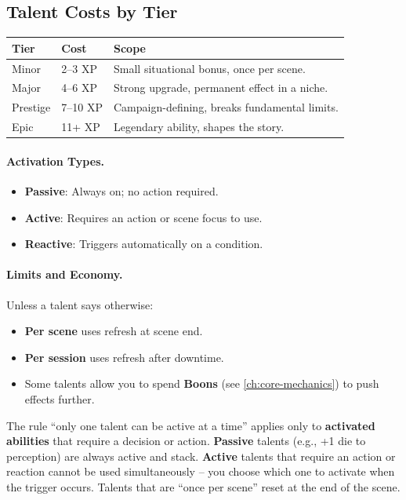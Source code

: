 \subsection*{Talent Costs by Tier}
\label{sec:talent-costs}

\begin{center}
\begin{tabular}{lll}
\toprule
\textbf{Tier} & \textbf{Cost} & \textbf{Scope} \\
\midrule
Minor & 2--3 XP & Small situational bonus, once per scene. \\
Major & 4--6 XP & Strong upgrade, permanent effect in a niche. \\
Prestige & 7--10 XP & Campaign-defining, breaks fundamental limits. \\
Epic & 11+ XP & Legendary ability, shapes the story. \\
\bottomrule
\end{tabular}
\end{center}

\paragraph{Activation Types.}
\label{sec:talent-activation}
\begin{itemize}
\item \textbf{Passive}: Always on; no action required.
\item \textbf{Active}: Requires an action or scene focus to use.
\item \textbf{Reactive}: Triggers automatically on a condition.
\end{itemize}

\paragraph{Limits and Economy.}
\label{sec:talent-limits}
Unless a talent says otherwise:
\begin{itemize}
\item \textbf{Per scene} uses refresh at scene end.
\item \textbf{Per session} uses refresh after downtime.
\item Some talents allow you to spend \textbf{Boons} (see \ref{ch:core-mechanics}) to push effects further.
\end{itemize}

\begin{tcolorbox}[colback=yellow!5!white,colframe=yellow!75!black,title=\textbf{Only One Active Talent?},breakable]
The rule ``only one talent can be active at a time'' applies only to \textbf{activated abilities} that require a decision or action.  
\textbf{Passive} talents (e.g., +1 die to perception) are always active and stack.  
\textbf{Active} talents that require an action or reaction cannot be used simultaneously -- you choose which one to activate when the trigger occurs.  
Talents that are ``once per scene'' reset at the end of the scene.
\end{tcolorbox}

